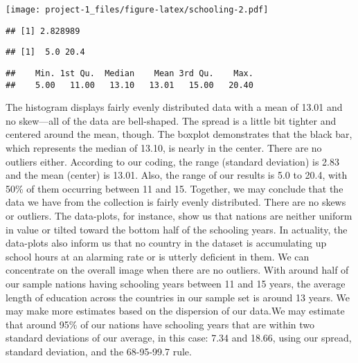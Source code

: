 \documentclass[
]{article}
\newenvironment{Shaded}{\begin{snugshade}}{\end{snugshade}}
\newcommand{\FunctionTok}[1]{\textcolor[rgb]{0.00,0.00,0.00}{#1}}
\newcommand{\NormalTok}[1]{#1}
\newcommand{\SpecialCharTok}[1]{\textcolor[rgb]{0.00,0.00,0.00}{#1}}
\begin{document}
\texttt{[image: project-1\_files/figure-latex/schooling-2.pdf]}

\begin{Shaded}
\end{Shaded}

\begin{verbatim}
## [1] 2.828989
\end{verbatim}

\begin{Shaded}
\end{Shaded}

\begin{verbatim}
## [1]  5.0 20.4
\end{verbatim}

\begin{Shaded}
\end{Shaded}

\begin{verbatim}
##    Min. 1st Qu.  Median    Mean 3rd Qu.    Max. 
##    5.00   11.00   13.10   13.01   15.00   20.40
\end{verbatim}

The histogram displays fairly evenly distributed data with a mean of
13.01 and no skew---all of the data are bell-shaped. The spread is a
little bit tighter and centered around the mean, though. The boxplot
demonstrates that the black bar, which represents the median of 13.10,
is nearly in the center. There are no outliers either. According to our
coding, the range (standard deviation) is 2.83 and the mean (center) is
13.01. Also, the range of our results is 5.0 to 20.4, with 50\% of them
occurring between 11 and 15. Together, we may conclude that the data we
have from the collection is fairly evenly distributed. There are no
skews or outliers. The data-plots, for instance, show us that nations
are neither uniform in value or tilted toward the bottom half of the
schooling years. In actuality, the data-plots also inform us that no
country in the dataset is accumulating up school hours at an alarming
rate or is utterly deficient in them. We can concentrate on the overall
image when there are no outliers. With around half of our sample nations
having schooling years between 11 and 15 years, the average length of
education across the countries in our sample set is around 13 years. We
may make more estimates based on the dispersion of our data.We may
estimate that around 95\% of our nations have schooling years that are
within two standard deviations of our average, in this case: 7.34 and
18.66, using our spread, standard deviation, and the 68-95-99.7 rule.
\end{document}
